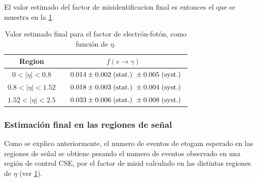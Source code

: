 El valor estimado del factor de misidentificacion final es entonces el que se muestra en la
{\tab} \ref{tab:efake_final}.

\begin{table}[!h]
  \centering
  \caption{Valor estimado final para el factor de {\misid} electrón-fotón, como función de $\eta$.}
  \begin{tabular}{cc}
    \hline
    \hline
     Region                &  $f(e\to \gamma)$  \\
    \hline
      $0 < |\eta| < 0.8$     & $ \quad  0.014 \pm 0.002 \mbox{$\;$(stat.)}\ \pm 0.005 \mbox{$\;$(syst.)}\ $ \\
      $0.8 < |\eta| < 1.52$  & $ \quad  0.018 \pm 0.003 \mbox{$\;$(stat.)}\ \pm 0.004 \mbox{$\;$(syst.)}\ $ \\
      $1.52 < |\eta| < 2.5$  & $ \quad  0.033 \pm 0.006 \mbox{$\;$(stat.)}\ \pm 0.008 \mbox{$\;$(syst.)}\ $ \\
    \hline
  \end{tabular}
  \label{tab:efake_final}
\end{table}

\subsubsection{Estimación final en las regiones de señal} \label{sec:efakes_estimation}

Como se explico anteriormente, el numero de eventos de etogam esperado en las regiones
de señal se obtiene pesando el numero de eventos observado en una región  de control CSE,
por el factor de misid calculado en las distintas regiones de $\eta$ (ver \cref{tab:efake_final}).



